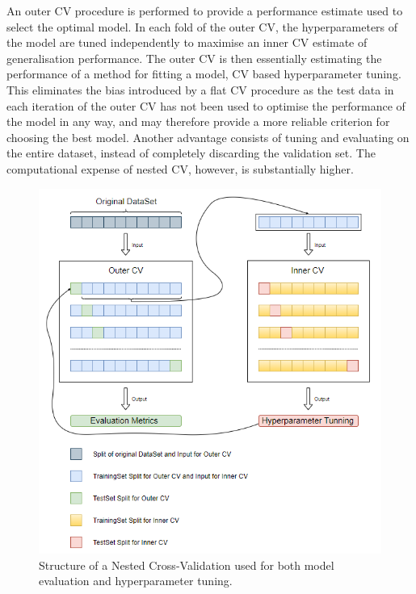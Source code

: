 An outer CV procedure is performed to provide a performance estimate used to select the optimal model. In each fold of the outer CV, the hyperparameters of the model are tuned independently to maximise an inner CV estimate of generalisation performance. The outer CV is then essentially estimating the performance of a method for fitting a model, CV based hyperparameter tuning. This eliminates the bias introduced by a flat CV procedure as the test data in each iteration of the outer CV has not been used to optimise the performance of the model in any way, and may therefore provide a more reliable criterion for choosing the best model. Another advantage consists of tuning and evaluating on the entire dataset, instead of completely discarding the validation set. The computational expense of nested CV, however, is substantially higher. \\



\begin{figure}[H]
  \centering
  \includegraphics[scale=0.95]{Images/nested_cv.png}
  \caption{Structure of a Nested Cross-Validation used for both model evaluation and hyperparameter tuning.}
  \label{NestedCV}
\end{figure}


